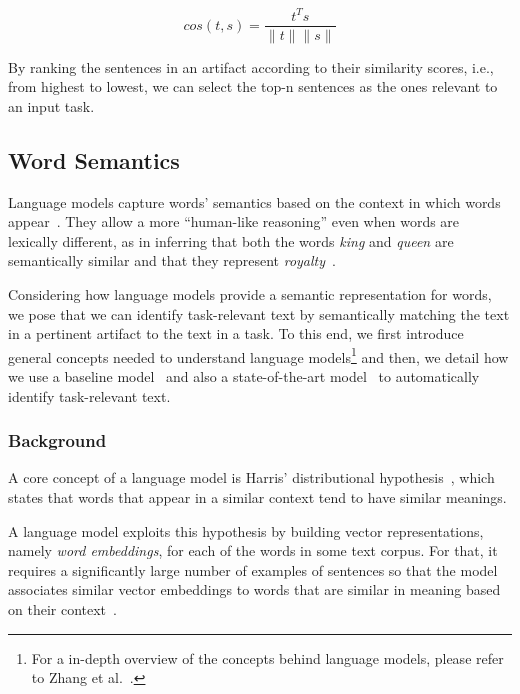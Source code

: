 \begin{equation}
    cos(t,s) = \frac{t^Ts}{\|t\| \|s\|}
    \label{eq:lex-sim}
\end{equation}
\smallskip

By ranking the sentences in an artifact according to their similarity scores, i.e., from highest to lowest,
we can  select the top-n sentences as the ones relevant to an input task.




\subsection{Word Semantics}


Language models capture words' semantics based on the context in which words appear~\cite{harris1954distributional}.
They allow a more ``human-like reasoning'' even when words are lexically different, as in 
inferring that both the words \textit{king} and \textit{queen} are semantically similar and that they represent \textit{royalty}~\cite{Mikolov2013}.


Considering how language models provide a semantic representation for words, we pose that we can identify task-relevant text by semantically matching the text in a pertinent artifact to the text in a task.
To this end, we first introduce general concepts needed to understand language models\footnote{
    For a in-depth overview of the concepts behind language models, please refer to Zhang et al.~\cite{zhang2021deep-learning}.
} and then, we detail how we use a baseline model~\cite{Mikolov2013} and also a state-of-the-art model~\cite{Devlin2018Bert} to automatically identify task-relevant text.





\subsubsection{Background}


A core concept of a language model is Harris' distributional hypothesis~\cite{harris1954distributional}, which states that words that appear in a similar context tend to have similar meanings.


A language model exploits this hypothesis by building vector representations, namely \textit{word embeddings}, for each of the words in some text corpus.
For that, it requires a significantly large number of examples of sentences so that
the model associates similar vector embeddings to words that are similar in meaning based on their context~\cite{Ye2016}. 

